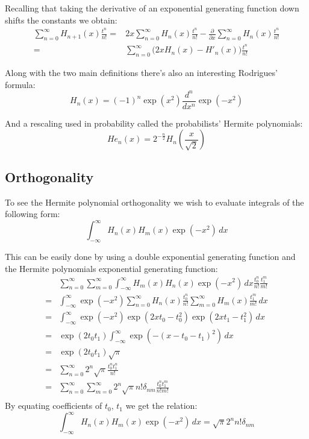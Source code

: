 \documentclass[12pt]{report}
\begin{document}
Recalling that taking the derivative of an exponential generating function down shifts the constants we obtain:
\begin{equation*}
\begin{aligned}
\sum_{n=0}^\infty H_{n+1}(x)\frac{t^n}{n!} =& 2x\sum_{n=0}^{\infty}H_n(x)\frac{t^n}{n!}-\frac{\partial}{\partial x}\sum_{n=0}^\infty H_n(x)\frac{t^n}{n!}\\
=& \sum_{n=0}^\infty\bigg(2xH_n(x)-H'_n(x)\bigg)\frac{t^n}{n!}
\end{aligned}
\end{equation*}

Along with the two main definitions there's also an interesting Rodrigues' formula:
\[H_n(x) = (-1)^n\exp(x^2)\frac{d^n}{d x^n}\exp(-x^2)\]

And a rescaling used in probability called the probabilists' Hermite polynomials:
\[He_n(x) = 2^{-\frac{n}{2}}H_n\left(\frac{x}{\sqrt{2}}\right)\]
\subsection{Orthogonality} 
To see the Hermite polynomial orthogonality we wish to evaluate integrals of the following form:
\[\int_{-\infty}^{\infty}H_n(x)H_m(x)\exp(-x^2)\,dx\]

This can be easily done by using a double exponential generating function and the Hermite polynomials exponential generating function:
\begin{equation*}
\begin{aligned}
&\sum_{n=0}^{\infty}\sum_{m=0}^{\infty}\int_{-\infty}^{\infty}H_m(x)H_n(x)\exp(-x^2)\,dx\frac{t_0^n}{n!}\frac{t_1^m}{m!}\\
=&\int_{-\infty}^{\infty}\exp(-x^2)\sum_{n=0}^{\infty}H_n(x)\frac{t_0^n}{n!}\sum_{m=0}^{\infty}H_m(x)\frac{t_1^m}{m!}\,dx \\
=&\int_{-\infty}^{\infty}\exp(-x^2)\exp(2xt_0-t_0^2)\exp(2xt_1-t_1^2)\,dx \\
=&\exp(2t_0t_1)\int_{-\infty}^{\infty}\exp(-(x-t_0-t_1)^2)\,dx\\
=&\exp(2t_0t_1)\sqrt{\pi}\\
=&\sum_{n=0}^{\infty}2^n\sqrt{\pi}\frac{t_0^nt_1^n}{n!} \\
=&\sum_{n=0}^{\infty}\sum_{m=0}^{\infty}2^n\sqrt{\pi}n!\delta_{nm}\frac{t_0^nt_1^m}{n!m!} \\
\end{aligned}
\end{equation*}
By equating coefficients of $t_0,\,t_1$ we get the relation:
\[\int_{-\infty}^\infty H_n(x)H_m(x)\exp(-x^2)\,dx = \sqrt{\pi}2^nn!\delta_{nm}\]
\end{document}
